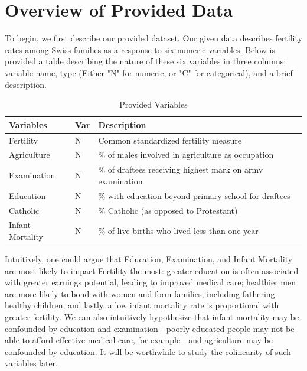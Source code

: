 \documentclass[preprint,12pt]{elsarticle}
\begin{document}

\section*{Overview of Provided Data}
\label{S:1}

\noindent To begin, we first describe our provided dataset. Our given data describes fertility rates among Swiss families as a response to six numeric variables. Below is provided a table describing the nature of these six variables in three columns: variable name, type (Either "N" for numeric, or "C" for categorical), and a brief description.

\begin{table}[h]
\centering
\begin{tabular}{l l l}
\hline
\textbf{Variables} & \textbf{Var} & \textbf{Description}\\
\hline
Fertility & N & Common standardized fertility measure \\
Agriculture & N & \% of males involved in agriculture as occupation \\
Examination & N & \% of draftees receiving highest mark on army examination \\
Education & N & \% with education beyond primary school for draftees \\
Catholic & N & \% Catholic (as opposed to Protestant) \\
Infant Mortality & N & \% of live births who lived less than one year \\
\hline
\end{tabular}
\caption{Provided Variables}
\end{table}

\noindent Intuitively, one could argue that Education, Examination, and Infant Mortality are most likely to impact Fertility the most: greater education is often associated with greater earnings potential, leading to improved medical care; healthier men are more likely to bond with women and form families, including fathering healthy children; and lastly, a low infant mortality rate is proportional with greater fertility. We can also intuitively hypothesize that infant mortality may be confounded by education and examination - poorly educated people may not be able to afford effective medical care, for example - and agriculture may be confounded by education. It will be worthwhile to study the colinearity of such variables later. \\
\end{document}
